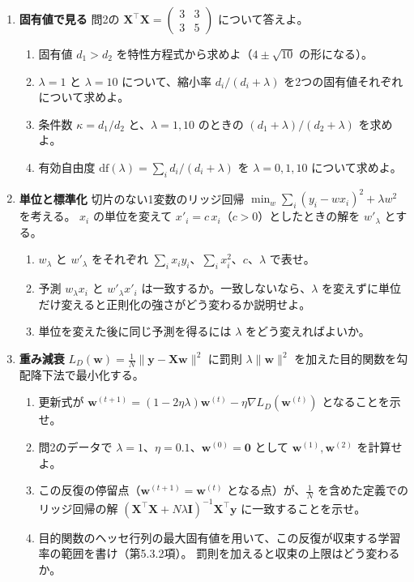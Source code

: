 \begin{enumerate}
  \item \textbf{固有値で見る}\quad
    問2の $\bm{X}^\top\bm{X} = \begin{pmatrix} 3 & 3 \\ 3 & 5 \end{pmatrix}$ について答えよ。
    \begin{enumerate}
      \item 固有値 $d_1 > d_2$ を特性方程式から求めよ（$4 \pm \sqrt{10}$ の形になる）。
      \item $\lambda = 1$ と $\lambda = 10$ について、縮小率 $d_i/(d_i + \lambda)$ を2つの固有値それぞれについて求めよ。
      \item 条件数 $\kappa = d_1/d_2$ と、$\lambda = 1, 10$ のときの $(d_1 + \lambda)/(d_2 + \lambda)$ を求めよ。
      \item 有効自由度 $\mathrm{df}(\lambda) = \sum_i d_i/(d_i + \lambda)$ を $\lambda = 0, 1, 10$ について求めよ。
    \end{enumerate}

  \item \textbf{単位と標準化}\quad
    切片のない1変数のリッジ回帰 $\min_w \sum_i (y_i - w x_i)^2 + \lambda w^2$ を考える。
    $x_i$ の単位を変えて $x'_i = c\,x_i$（$c > 0$）としたときの解を $w'_\lambda$ とする。
    \begin{enumerate}
      \item $w_\lambda$ と $w'_\lambda$ をそれぞれ $\sum_i x_i y_i$、$\sum_i x_i^2$、$c$、$\lambda$ で表せ。
      \item 予測 $w_\lambda x_i$ と $w'_\lambda x'_i$ は一致するか。一致しないなら、$\lambda$ を変えずに単位だけ変えると正則化の強さがどう変わるか説明せよ。
      \item 単位を変えた後に同じ予測を得るには $\lambda$ をどう変えればよいか。
    \end{enumerate}

  \item \textbf{重み減衰}\quad
    $L_D(\bm{w}) = \frac{1}{N}\|\bm{y} - \bm{X}\bm{w}\|^2$ に罰則 $\lambda\|\bm{w}\|^2$ を加えた目的関数を勾配降下法で最小化する。
    \begin{enumerate}
      \item 更新式が $\bm{w}^{(t+1)} = (1 - 2\eta\lambda)\bm{w}^{(t)} - \eta\nabla L_D(\bm{w}^{(t)})$ となることを示せ。
      \item 問2のデータで $\lambda = 1$、$\eta = 0.1$、$\bm{w}^{(0)} = \bm{0}$ として $\bm{w}^{(1)}, \bm{w}^{(2)}$ を計算せよ。
      \item この反復の停留点（$\bm{w}^{(t+1)} = \bm{w}^{(t)}$ となる点）が、$\frac{1}{N}$ を含めた定義でのリッジ回帰の解
        $(\bm{X}^\top\bm{X} + N\lambda\bm{I})^{-1}\bm{X}^\top\bm{y}$ に一致することを示せ。
      \item 目的関数のヘッセ行列の最大固有値を用いて、この反復が収束する学習率の範囲を書け（第5.3.2項）。
        罰則を加えると収束の上限はどう変わるか。
    \end{enumerate}


\end{enumerate}
